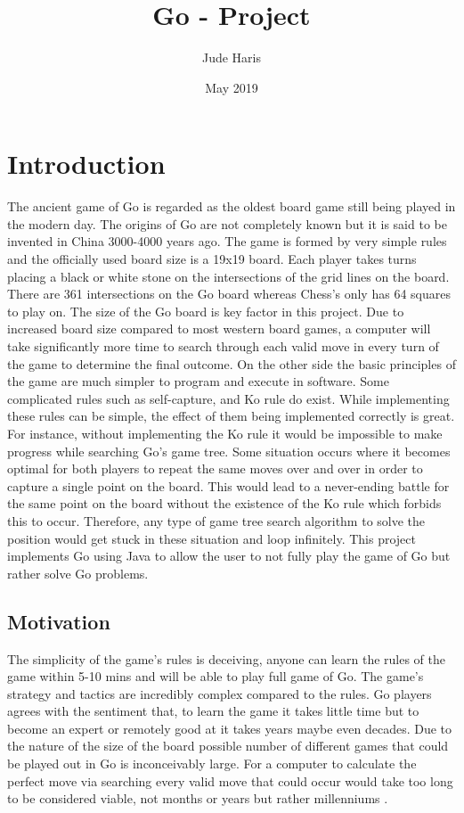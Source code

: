 \documentclass{l4proj}
\title{Go - Project}
\author{Jude Haris}
\date{May 2019}
\begin{document}
\maketitle


\chapter{Introduction}
The ancient game of Go is regarded as the oldest board game still being played in the modern day. The origins of Go are not completely known but it is said to be invented in China 3000-4000 years ago. The game is formed by very simple rules and the officially used board size is a 19x19 board. Each player takes turns placing a black or white stone on the intersections of the grid lines on the board. There are 361 intersections on the Go board whereas Chess’s only has 64 squares to play on. The size of the Go board is key factor in this project. Due to increased board size compared to most western board games, a computer will take significantly more time to search through each valid move in every turn of the game to determine the final outcome. On the other side the basic principles of the game are much simpler to program and execute in software. Some complicated rules such as self-capture, and Ko rule do exist. While implementing these rules can be simple, the effect of them being implemented correctly is great. For instance, without implementing the Ko rule it would be impossible to make progress while searching Go’s game tree. Some situation occurs where it becomes optimal for both players to repeat the same moves over and over in order to capture a single point on the board.  This would lead to a never-ending battle for the same point on the board without the existence of the Ko rule which forbids this to occur. Therefore, any type of game tree search algorithm to solve the position would get stuck in these situation and loop infinitely. This project implements Go using Java to allow the user to not fully play the game of Go but rather solve Go problems.
\section{Motivation}
The simplicity of the game's rules is deceiving, anyone can learn the rules of the game within 5-10 mins and will be able to play full game of Go. The game's strategy and tactics are incredibly complex compared to the rules. Go players agrees with the sentiment that, to learn the game it takes little time but to become an expert or remotely good at it takes years maybe even decades. Due to the nature of the size of the board possible number of different games that could be played out in Go is inconceivably large. For a computer to calculate the perfect move via searching every valid move that could occur would take too long to be considered viable, not months or years but rather millenniums .
\end{document}
